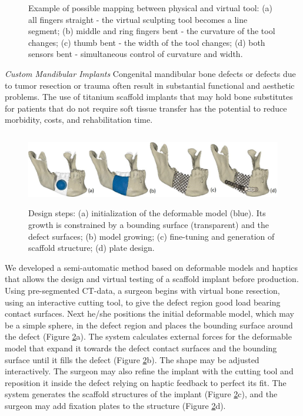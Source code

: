\begin{enumerate}
{\begin{figure}[!h]
\caption{\label{fig:haptic2} Example of possible mapping between physical and virtual tool: (a) all fingers straight - the virtual sculpting tool becomes a line segment; (b) middle and ring fingers bent - the curvature of the tool changes; (c) thumb bent - the width of the tool changes; (d) both sensors bent - simultaneous control of curvature and width.} 
\end{figure}
\newpage
\textit{Custom Mandibular Implants} Congenital mandibular bone defects or defects due to tumor resection or trauma often result in substantial functional and aesthetic problems. The use of titanium scaffold implants that may hold bone substitutes for patients that do not require soft tissue transfer has the potential to reduce morbidity, costs, and rehabilitation time.

\begin{figure}[!h]
\centering
\includegraphics[width=125mm,height=32mm]{figures/research/haptic7.jpg}
\caption{\label{fig:haptic3} Design steps: (a) initialization of the deformable model (blue). Its growth is constrained by a bounding surface (transparent) and the defect surfaces; (b) model growing; (c) fine-tuning and generation of scaffold structure; (d) plate design.} 
\end{figure}

We developed a semi-automatic method based on deformable models and haptics that allows the design and virtual testing of a scaffold implant before production. Using pre-segmented CT-data, a surgeon begins with virtual bone resection, using an interactive cutting tool, to give the defect region good load bearing contact surfaces. Next he/she positions the initial deformable model, which may be a simple sphere, in the defect region and places the bounding surface around the defect (Figure \ref{fig:haptic3}a). The system calculates external forces for the deformable model that expand it towards the defect contact surfaces and the bounding surface until it fills the defect (Figure \ref{fig:haptic3}b). The shape may be adjusted interactively. The surgeon may also refine the implant with the cutting tool and reposition it inside the defect relying on haptic feedback to perfect its fit. The system generates the scaffold structures of the implant (Figure \ref{fig:haptic3}c), and the surgeon may add fixation plates to the structure (Figure \ref{fig:haptic3}d).
}


\end{enumerate}
